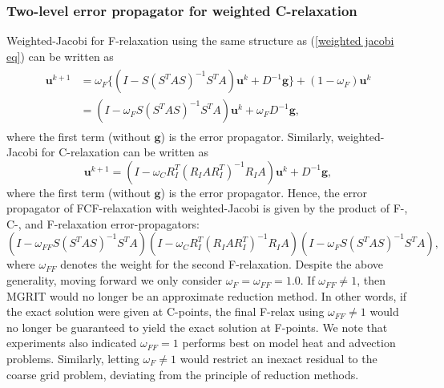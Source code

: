 \documentclass[VANCOUVER,STIX1COL]{WileyNJD-v2}
\begin{document}
\subsubsection{Two-level error propagator for weighted C-relaxation}
Weighted-Jacobi for F-relaxation using the same structure as (\ref{weighted jacobi eq}) can be written as
\begin{align}
\begin{split}
\mathbf{u}^{k+1} &= \omega_F \{(I-S(S^TAS)^{-1}S^TA)\mathbf{u}^k + D^{-1}\mathbf{g}\} + (1-\omega_F) \mathbf{u}^k \\
&= (I - \omega_F S(S^TAS)^{-1}S^TA)\mathbf{u}^k + \omega_F D^{-1}\mathbf{g},
\end{split}
\end{align}
where the first term (without $\mathbf{g}$) is the error propagator.  
Similarly, weighted-Jacobi for C-relaxation can be written as
\begin{equation} \label{C-realx}
\mathbf{u}^{k+1} = (I - \omega_C R^T_I(R_IAR^T_I)^{-1}R_IA) \mathbf{u}^k + D^{-1}\mathbf{g},
\end{equation}
where the first term (without $\mathbf{g}$) is the error propagator.
Hence, the error propagator of FCF-relaxation with weighted-Jacobi is given by
the product of F-, C-, and F-relaxation error-propagators:
\begin{equation}
   (I-\omega_{FF} S(S^TAS)^{-1}S^TA)(I-\omega_C R^T_I(R_IAR^T_I)^{-1}R_IA)(I-\omega_F S(S^TAS)^{-1}S^TA),
\end{equation}
where $\omega_{FF}$ denotes the weight for the second F-relaxation. Despite the above generality, moving forward we only consider $\omega_F = \omega_{FF} = 1.0$.
If $\omega_{FF} \neq 1$, then MGRIT would no longer be an approximate reduction method.
In other words, if the exact solution were given at C-points, the final F-relax using $\omega_{FF}\neq 1$ would no longer be guaranteed to yield the exact solution at F-points.
We note that experiments also indicated $\omega_{FF} = 1$ performs best on model heat and advection problems. 
Similarly, letting $\omega_F \neq 1$ would restrict an inexact residual to the coarse grid problem, deviating from the principle of reduction methods. 
\end{document}
